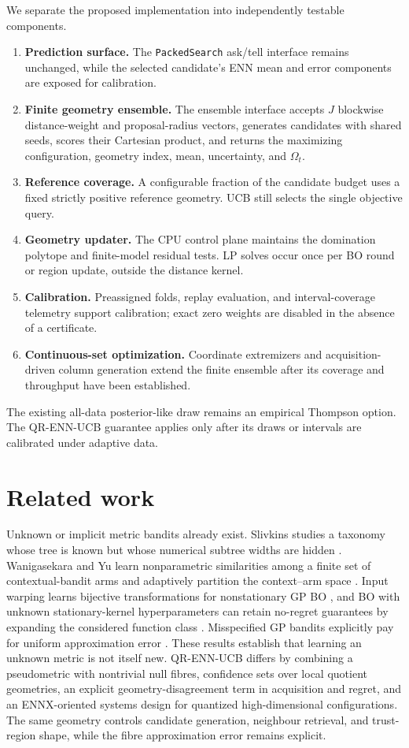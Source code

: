 \documentclass[11pt]{article}
\theoremstyle{definition}
\theoremstyle{remark}
\newcommand{\1}{\mathbf 1}
\begin{document}
We separate the proposed implementation into independently testable components.
\begin{enumerate}
\item \textbf{Prediction surface.}  The \texttt{PackedSearch} ask/tell interface remains unchanged,
while the selected candidate's ENN mean and error components are exposed for calibration.
\item \textbf{Finite geometry ensemble.}  The ensemble interface accepts $J$ blockwise
distance-weight and proposal-radius vectors, generates candidates with shared seeds, scores their
Cartesian product, and returns the maximizing configuration, geometry index, mean, uncertainty, and
$\Omega_t$.
\item \textbf{Reference coverage.}  A configurable fraction of the candidate budget uses a fixed
strictly positive reference geometry.  UCB still selects the single objective query.
\item \textbf{Geometry updater.}  The CPU control plane maintains the domination polytope and
finite-model residual tests.  LP solves occur once per BO round or region update, outside the
distance kernel.
\item \textbf{Calibration.}  Preassigned folds, replay evaluation, and interval-coverage telemetry
support calibration; exact zero weights are disabled in the absence of a certificate.
\item \textbf{Continuous-set optimization.}  Coordinate extremizers and acquisition-driven column
generation extend the finite ensemble after its coverage and throughput have been established.
\end{enumerate}

The existing all-data posterior-like draw remains an empirical Thompson option.  The QR-ENN-UCB
guarantee applies only after its draws or intervals are calibrated under adaptive data.

\section{Related work}

Unknown or implicit metric bandits already exist.  Slivkins studies a taxonomy whose tree is known
but whose numerical subtree widths are hidden \cite{ImplicitMetric}.  Wanigasekara and Yu learn
nonparametric similarities among a finite set of contextual-bandit arms and adaptively partition the
context--arm space \cite{UnknownMetric}.  Input warping learns bijective transformations for
nonstationary GP BO \cite{InputWarping}, and BO with unknown stationary-kernel hyperparameters can
retain no-regret guarantees by expanding the considered function class \cite{UnknownHyper}.
Misspecified GP bandits explicitly pay for uniform approximation error \cite{MisspecifiedGP}.
These results establish that learning an unknown metric is not itself new.  QR-ENN-UCB differs by
combining a pseudometric with nontrivial null fibres, confidence sets over local quotient geometries,
an explicit geometry-disagreement term in acquisition and regret, and an ENNX-oriented systems design for
quantized high-dimensional configurations.  The same geometry controls candidate generation,
neighbour retrieval, and trust-region shape, while the fibre approximation error remains explicit.
\end{document}
